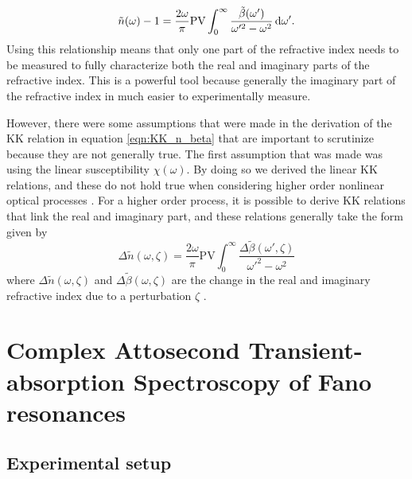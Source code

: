 \begin{equation}
	\label{eqn:KK_n_beta}
	\tilde{n}(\omega) - 1 = \frac{2\omega}{\pi}\mathrm{PV}\int_{0}^{\infty} \frac{\tilde{\beta}(\omega')}{\omega'^2 - \omega^2} \mathop{}\!\mathrm{d} \omega'.
\end{equation}
Using this relationship means that only one part of the refractive index needs to be measured to fully characterize both the real and imaginary parts of the refractive index.  This is a powerful tool because generally the imaginary part of the refractive index in much easier to experimentally measure.

However, there were some assumptions that were made in the derivation of the KK relation in equation \ref{eqn:KK_n_beta} that are important to scrutinize because they are not generally true.  The first assumption that was made was using the linear susceptibility $\chi(\omega)$.  By doing so we derived the linear KK relations, and these do not hold true when considering higher order nonlinear optical processes \cite{lucariniKramersKronigRelationsOptical2005, hutchingsKramersKronigRelationsNonlinear1992}.  For a higher order process, it is possible to derive KK relations that link the real and imaginary part, and these relations generally take the form given by
\begin{equation}
	\label{eqn:dn_db_KK}
	\Delta\tilde{n}(\omega, \zeta) = \frac{2\omega}{\pi} \mathrm{PV}\int_{0}^{\infty} \frac{\Delta\tilde{\beta}(\omega',\zeta)}{\omega'^2 - \omega^2} 
\end{equation}  
where $\Delta\tilde{n}(\omega, \zeta)$ and $\Delta\tilde{\beta}(\omega,\zeta)$ are the change in the real and imaginary refractive index due to a perturbation $\zeta$ \cite{hutchingsKramersKronigRelationsNonlinear1992, lucariniKramersKronigRelationsOptical2005}.

\section{Complex Attosecond Transient-absorption Spectroscopy of Fano resonances}
\label{sec:CATS_ar}

\subsection{Experimental setup}
\label{sec:CATS_ar_exp_setup}

